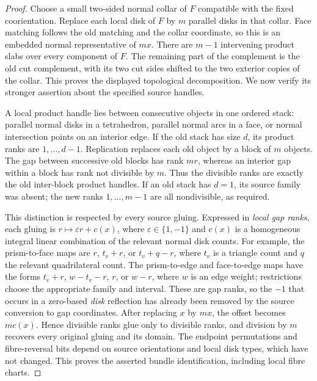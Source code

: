 \begin{proof}
Choose a small two-sided normal collar of $F$ compatible with the fixed
coorientation.  Replace each local disk of $F$ by $m$ parallel disks in
that collar.  Face matching follows the old matching and the collar
coordinate, so this is an embedded normal representative of $mx$.
There are $m-1$ intervening product slabs over every component of $F$.
The remaining part of the complement is the old cut complement, with
its two cut sides shifted to the two exterior copies of the collar.
This proves the displayed topological decomposition.  We now verify
its stronger assertion about the specified source handles.

A local product handle lies between consecutive objects in one ordered
stack: parallel normal disks in a tetrahedron, parallel normal arcs in
a face, or normal intersection points on an interior edge.  If the old
stack has size $d$, its product ranks are $1,\ldots,d-1$.  Replication
replaces each old object by a block of $m$ objects.  The gap between
successive old blocks has rank $mr$, whereas an interior gap within a
block has rank not divisible by $m$.  Thus the divisible ranks are
exactly the old inter-block product handles.  If an old stack has
$d=1$, its source family was absent; the new ranks $1,\ldots,m-1$
are all nondivisible, as required.

This distinction is respected by every source gluing.  Expressed in
\emph{local gap ranks}, each gluing is
$r\mapsto\varepsilon r+c(x)$, where $\varepsilon\in\{1,-1\}$ and
$c(x)$ is a homogeneous integral linear combination of the relevant
normal disk counts.  For example, the prism-to-face maps are $r$,
$t_v+r$, or $t_v+q-r$, where $t_v$ is a triangle count and $q$ the
relevant quadrilateral count.  The prism-to-edge and face-to-edge maps
have the forms $t_v+r$, $w-t_v-r$, $r$, or $w-r$, where $w$ is an
edge weight; restrictions choose the appropriate family and interval.
These are gap ranks, so the $-1$ that occurs in a zero-based
\emph{disk} reflection has already been removed by the source conversion
to gap coordinates.  After replacing $x$ by $mx$, the offset becomes
$mc(x)$.  Hence divisible ranks glue only to divisible ranks, and
division by $m$ recovers every original gluing and its domain.  The
endpoint permutations and fibre-reversal bits depend on source
orientations and local disk types, which have not changed.  This proves
the asserted bundle identification, including local fibre charts.


\end{proof}
